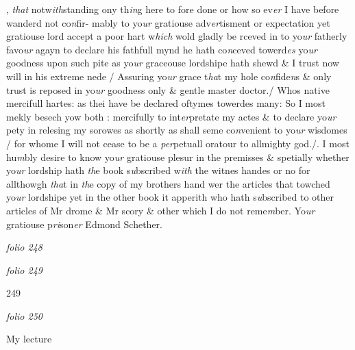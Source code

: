 \documentclass[12pt, a4paper]{book}
\begin{document}
			, \textit{that} notw\textit{ith}standing ony th\textit{in}g here to fore done or how so ev\textit{er} I have before wanderd not co\textit{n}fir- mably to yo\textit{ur} gratiouse adv\textit{er}tisment or expectation yet gratiouse lord accept a poor hart w\textit{hich} wold gladly be rceved in to yo\textit{ur} fatherly favo\textit{ur} agayn to declare his fathfull mynd he hath co\textit{n}ceved towerd\textit{es} yo\textit{ur} goodness upon such pite as yo\textit{ur} graceouse lordshipe hath shewd \&  I trust now will in his extreme nede / Assuring yo\textit{ur} grace t\textit{ha}t my  hole co\textit{n}fide\textit{n}s \& only trust is reposed in yo\textit{ur} goodness only \& gentle master doctor./ Whos native mercifull hartes: as thei have  be declared oftymes towerdes many: So I most mekly besech yow both : mercifully to int\textit{er}pretate my actes \& to declare yo\textit{ur }pety in relesing my sorowes as shortly as shall seme co\textit{n}venient to yo\textit{ur} wisdomes / for whome I will not cease to be a \textit{per}petuall oratour to allmighty god./. I most hu\textit{m}bly desire to know yo\textit{ur} gratiouse plesur in the premisses \& spetially whether yo\textit{ur} lordship hath \textit{th}e book s\textit{u}bscribed w\textit{ith} the witnes handes or no for allthowgh\textit{ tha}t in \textit{th}e copy of my brothers hand wer the articles that towched yo\textit{ur} lordshipe yet in the other  book it apperith who hath s\textit{u}bscribed to other articles of Mr drome \&  Mr scory \& other which I do not reme\textit{m}ber.  Yo\textit{ur} gratiouse p\textit{ri}son\textit{er} Edmond Schether.

\dotfill
					

\textit{folio 248}


         \vspace{4cm}
         
\dotfill
					

\textit{folio 249}


{\color{Mahogany}249}

\dotfill
					

\textit{folio 250}


My lecture

\dotfill
					  \section*{}
\end{document}
